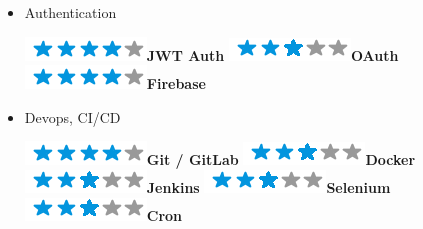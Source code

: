 \documentclass[]{friggeri-cv}
\begin{document}
\begin{flushleft}
\begin{multicols}{3}
\begin{itemize}
\item \large Authentication \
\normalsize
\begin{flushleft}

\includegraphics[scale=0.40]{res/img/4stars.png}\hspace{1.5mm}\textbf{JWT Auth}
\includegraphics[scale=0.40]{res/img/3stars.png}\hspace{1.5mm}\textbf{OAuth}
\includegraphics[scale=0.40]{res/img/4stars.png}\hspace{1.5mm}\textbf{Firebase}
\end{flushleft}            

\item \large Devops, CI/CD \
\normalsize
\begin{flushleft}

\includegraphics[scale=0.40]{res/img/4stars.png}\hspace{1.5mm}\textbf{Git / GitLab}
\includegraphics[scale=0.40]{res/img/3stars.png}\hspace{1.5mm}\textbf{Docker}
\includegraphics[scale=0.40]{res/img/3stars.png}\hspace{1.5mm}\textbf{Jenkins}
\includegraphics[scale=0.40]{res/img/3stars.png}\hspace{1.5mm}\textbf{Selenium}
\includegraphics[scale=0.40]{res/img/3stars.png}\hspace{1.5mm}\textbf{Cron}
\end{flushleft}            


\end{itemize}
\end{multicols}
\end{flushleft}
\end{document}
